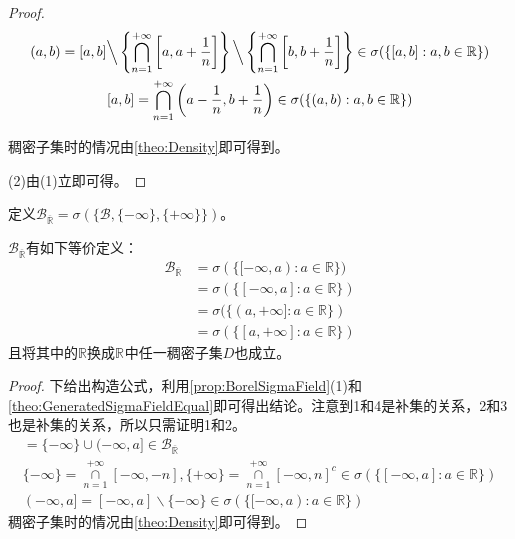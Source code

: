 \begin{proof}
\begin{gather*}
		(a,b)=[a,b]\Big\backslash\left\{\underset{n=1}{\overset{+\infty}{\bigcap}}\left[a,a+\frac{1}{n}\right]\right\}\Big\backslash\left\{\underset{n=1}{\overset{+\infty}{\bigcap}}\left[b,b+\frac{1}{n}\right]\right\}\in\sigma(\{[a,b]:a,b\in\mathbb{R}\}) \\
		[a,b]=\underset{n=1}{\overset{+\infty}{\bigcap}}\left(a-\frac{1}{n},b+\frac{1}{n}\right)\in\sigma(\{(a,b):a,b\in\mathbb{R}\})
	\end{gather*}\par
	稠密子集时的情况由\cref{theo:Density}即可得到。\par
	(2)由(1)立即可得。
\end{proof}
\begin{definition}
	定义$\mathcal{B}_{\overline{\mathbb{R}}}=\sigma(\{\mathcal{B},\{-\infty\},\{+\infty\}\})$。
\end{definition}
\begin{theorem}\label{theo:BorelRwqEquivDef}
	$\mathcal{B}_{\overline{\mathbb{R}}}$有如下等价定义：
	\begin{align*}
		\mathcal{B}_{\overline{\mathbb{R}}}
		&=\sigma(\{[-\infty,a):a\in\mathbb{R}\}) \\
		&=\sigma(\{[-\infty,a]:a\in\mathbb{R}\}) \\
		&=\sigma(\{(a,+\infty]:a\in\mathbb{R}\}) \\
		&=\sigma(\{[a,+\infty]:a\in\mathbb{R}\})
	\end{align*}
	且将其中的$\mathbb{R}$换成$\mathbb{R}^{}$中任一稠密子集$D$也成立。
\end{theorem}
\begin{proof}
	下给出构造公式，利用\cref{prop:BorelSigmaField}(1)和\cref{theo:GeneratedSigmaFieldEqual}即可得出结论。注意到1和4是补集的关系，2和3也是补集的关系，所以只需证明1和2。
	\begin{gather*}
		[-\infty,a)=\{-\infty\}\cup(-\infty,a)\in\mathcal{B}_{\overline{\mathbb{R}}} \\
		\{-\infty\}=\underset{n=1}{\overset{+\infty}{\cap}}[-\infty, -n),\{+\infty\}=\underset{n=1}{\overset{+\infty}{\cap}}[-\infty,n)^c\in\sigma(\{[-\infty,a):a\in\mathbb{R}\}) \\
		(-\infty, a)=[-\infty,a)\backslash\{-\infty\}\in\sigma(\{[-\infty,a):a\in\mathbb{R}\}) \\
		[-\infty,a]=\{-\infty\}\cup(-\infty,a]\in\mathcal{B}_{\overline{\mathbb{R}}} \\
		\{-\infty\}=\underset{n=1}{\overset{+\infty}{\cap}}[-\infty,-n],\{+\infty\}=\underset{n=1}{\overset{+\infty}{\cap}}[-\infty,n]^c\in\sigma(\{[-\infty,a]:a\in\mathbb{R}\}) \\
		(-\infty,a]=[-\infty,a]\backslash\{-\infty\}\in\sigma(\{[-\infty,a):a\in\mathbb{R}\})
	\end{gather*}
	稠密子集时的情况由\cref{theo:Density}即可得到。
\end{proof}



